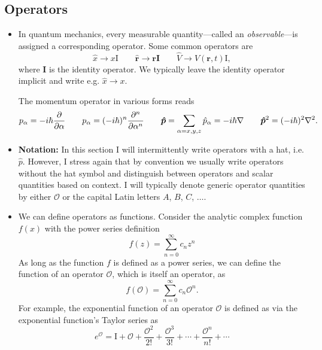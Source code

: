 \documentclass[11pt, a4paper]{article}
\renewcommand{\grad}{\nabla}
\renewcommand{\laplacian}{\nabla^{2}}
\renewcommand{\vec}[1]{\bm{#1}}  %
\newcommand{\mat}[1]{\mathbf{#1}}  %
\renewcommand{\r}{\vec{r}}  %
\renewcommand{\O}{\mathcal{O}}  %
\begin{document}
\subsection{Operators}
\begin{itemize}
	\item In quantum mechanics, every measurable quantity---called an \textit{observable}---is assigned a corresponding operator. Some common operators are
	\begin{equation*}
		\hat{x} \to x \mathrm{I} \qquad \hat{\r} \to \r \mat{I} \qquad \hat{V} \to V(\r, t)\mathrm{I},
	\end{equation*}
	where $ \mat{I} $ is the identity operator. We typically leave the identity operator implicit and write e.g. $ \hat{x} \to x $. 
	
	The momentum operator in various forms reads
	\begin{equation*}
		p_{\alpha} = -i\hbar \pdv{}{\alpha} \qquad p_{\alpha} = (-i\hbar)^{n} \pdv[n]{}{\alpha} \qquad \vec{\hat{p}} = \sum_{\alpha = x, y, z} \hat{p}_{\alpha} = - i \hbar \grad \qquad \vec{\hat{p}}^{2} = (-i\hbar)^{2} \laplacian.
	\end{equation*}
	
	\item \textbf{Notation:} In this section I will intermittently write operators with a hat, i.e. $ \hat{p} $. However, I stress again that by convention we usually write operators without the hat symbol and distinguish between operators and scalar quantities based on context. I will typically denote generic operator quantities by either $ \O $ or the capital Latin letters $ A $, $ B $, $ C $, $ \ldots  $.
	
	\item We can define operators as functions. Consider the analytic complex function $ f(x) $ with the power series definition
	\begin{equation*}
		f(z) = \sum_{n=0}^{\infty}c_{n}z^{n}
	\end{equation*}
	As long as the function $ f $ is defined as a power series, we can define the function of an operator $ \O $, which is itself an operator, as
	\begin{equation*}
		f(\O) = \sum_{n = 0}^{\infty}c_{n} \O^{n}.	
	\end{equation*}
	For example, the exponential function of an operator $ \O $ is defined as via the exponential function's Taylor series as
	\begin{equation*}
		e^{\O} = \mathrm{I} + \O + \frac{\O^{2}}{2!} + \frac{\O^{3}}{3!} + \cdots + \frac{\O^{n}}{n!} + \cdots 
	\end{equation*}
	

\end{itemize}
\end{document}
